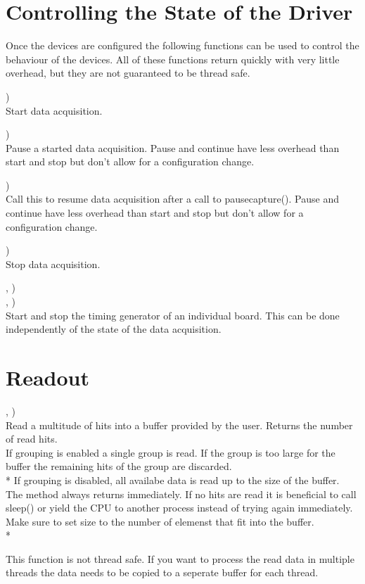 	\section{Controlling the State of the Driver}
	Once the devices are configured the following functions can be used to control the behaviour of the devices. 
	All of these functions return quickly with very little overhead, but they are not guaranteed to be thread safe.

		\device)\\
		Start data acquisition.\par

		\device)\\
		Pause a started data acquisition. 
		Pause and continue have less overhead than start and stop but don't allow for a configuration change.\par

		\device)\\
		Call this to resume data acquisition after a call to \textsf{\prefix pause\tu capture()}.
		Pause and continue have less overhead than start and stop but don't allow for a configuration change.\par

		\device)\\
		Stop data acquisition.\par

		\device, )\\
		\device, )\\
		Start and stop the timing generator of an individual board. 
		This can be done independently of the state of the data acquisition.\par	


\section{Readout}

\device,    )\\
Read a multitude of hits into a buffer provided by the user. Returns the number of read hits.\\
If grouping is enabled a single group is read. 
If the group is too large for the buffer the remaining hits of the group are discarded.\\*
If grouping is disabled, all availabe data is read up to the size of the buffer. \\
The method always returns immediately. If no hits are read it is beneficial to call \textsf{sleep()} 
or yield the CPU to another process instead of trying again immediately.\\
Make sure to set \textsf{size} to the number of elemenst that fit into the buffer.\\*

This function is not thread safe. 
If you want to process the read data in multiple threads the data needs to be copied to a seperate buffer for each thread.
